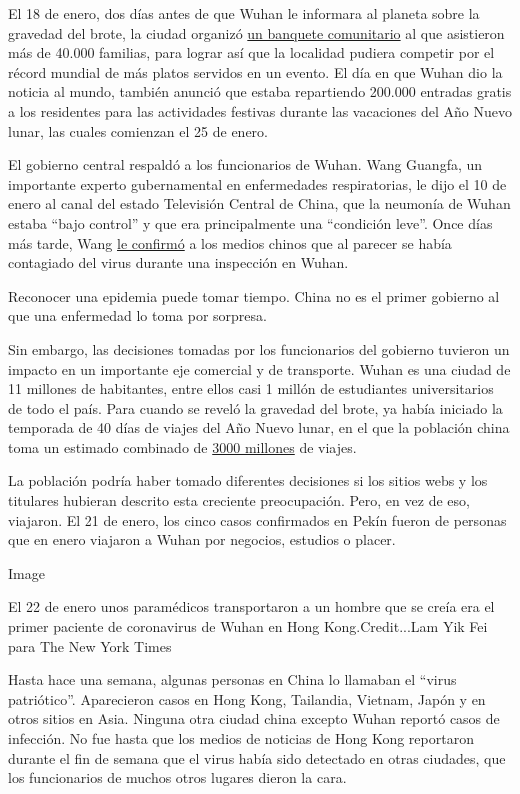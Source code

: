 El 18 de enero, dos días antes de que Wuhan le informara al planeta
sobre la gravedad del brote, la ciudad organizó
\href{https://m.weibo.cn/status/4462935805605012?}{un banquete
comunitario} al que asistieron más de 40.000 familias, para lograr así
que la localidad pudiera competir por el récord mundial de más platos
servidos en un evento. El día en que Wuhan dio la noticia al mundo,
también anunció que estaba repartiendo 200.000 entradas gratis a los
residentes para las actividades festivas durante las vacaciones del Año
Nuevo lunar, las cuales comienzan el 25 de enero.

El gobierno central respaldó a los funcionarios de Wuhan. Wang Guangfa,
un importante experto gubernamental en enfermedades respiratorias, le
dijo el 10 de enero al canal del estado Televisión Central de China, que
la neumonía de Wuhan estaba ``bajo control'' y que era principalmente
una ``condición leve''. Once días más tarde, Wang
\href{https://www.weibo.com/2656274875/IqCSrAXel?type=comment\#_rnd1579700865617}{le
confirmó} a los medios chinos que al parecer se había contagiado del
virus durante una inspección en Wuhan.

Reconocer una epidemia puede tomar tiempo. China no es el primer
gobierno al que una enfermedad lo toma por sorpresa.

Sin embargo, las decisiones tomadas por los funcionarios del gobierno
tuvieron un impacto en un importante eje comercial y de transporte.
Wuhan es una ciudad de 11 millones de habitantes, entre ellos casi 1
millón de estudiantes universitarios de todo el país. Para cuando se
reveló la gravedad del brote, ya había iniciado la temporada de 40 días
de viajes del Año Nuevo lunar, en el que la población china toma un
estimado combinado de
\href{http://www.xinhuanet.com/english/2020-01/10/c_138694239.htm}{3000
millones} de viajes.

La población podría haber tomado diferentes decisiones si los sitios
webs y los titulares hubieran descrito esta creciente preocupación.
Pero, en vez de eso, viajaron. El 21 de enero, los cinco casos
confirmados en Pekín fueron de personas que en enero viajaron a Wuhan
por negocios, estudios o placer.

Image

El 22 de enero unos paramédicos transportaron a un hombre que se creía
era el primer paciente de coronavirus de Wuhan en Hong Kong.Credit...Lam
Yik Fei para The New York Times

Hasta hace una semana, algunas personas en China lo llamaban el ``virus
patriótico''. Aparecieron casos en Hong Kong, Tailandia, Vietnam, Japón
y en otros sitios en Asia. Ninguna otra ciudad china excepto Wuhan
reportó casos de infección. No fue hasta que los medios de noticias de
Hong Kong reportaron durante el fin de semana que el virus había sido
detectado en otras ciudades, que los funcionarios de muchos otros
lugares dieron la cara.

